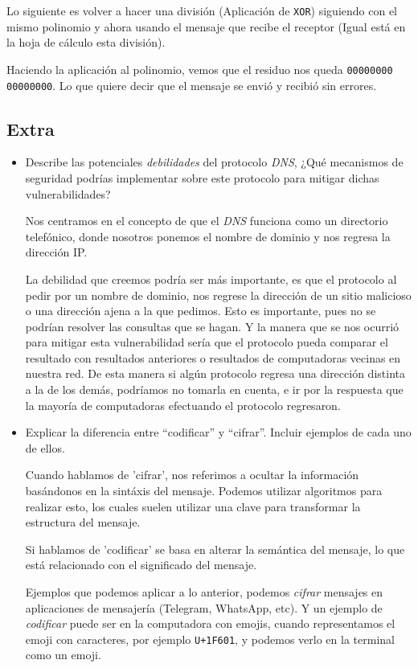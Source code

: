 \documentclass[spanish,12pt,letterpaper]{article}
\begin{document}
Lo siguiente es volver a hacer una división (Aplicación de \texttt{XOR})
siguiendo con el mismo polinomio y ahora usando el mensaje que recibe el
receptor (Igual está en la hoja de cálculo esta división).

Haciendo la aplicación al polinomio, vemos que el residuo nos queda
\texttt{00000000 00000000}. Lo que quiere decir que el mensaje se envió y recibió
sin errores.


\subsection{Extra}
\begin{itemize}
\item Describe las potenciales \textit{debilidades} del protocolo \textit{DNS},
  ¿Qué mecanismos de seguridad podrías implementar sobre este protocolo para
  mitigar dichas vulnerabilidades?

  Nos centramos en el concepto de que el \textit{DNS} funciona como un directorio
  telefónico, donde nosotros ponemos el nombre de dominio y nos regresa la
  dirección IP.

  La debilidad que creemos podría ser más importante, es que el protocolo al
  pedir por un nombre de dominio, nos regrese la dirección de un sitio malicioso
  o una dirección ajena a la que pedimos. Esto es importante, pues no se podrían
  resolver las consultas que se hagan. Y la manera que se nos ocurrió para
  mitigar esta vulnerabilidad sería que el protocolo pueda comparar el resultado
  con resultados anteriores o resultados de computadoras vecinas en nuestra red.
  De esta manera si algún protocolo regresa una dirección distinta a la de los
  demás, podríamos no tomarla en cuenta, e ir por la respuesta que la mayoría de
  computadoras efectuando el protocolo regresaron.

  
\item Explicar la diferencia entre ``codificar'' y ``cifrar''. Incluir ejemplos
  de cada uno de ellos.

  Cuando hablamos de 'cifrar', nos referimos a ocultar la información basándonos
  en la sintáxis del mensaje. Podemos utilizar algoritmos para realizar esto, los
  cuales suelen utilizar una clave para transformar la estructura del mensaje.

  Si hablamos de 'codificar' se basa en alterar la semántica del mensaje, lo que
  está relacionado con el significado del mensaje.

  Ejemplos que podemos aplicar a lo anterior, podemos \textit{cifrar} mensajes en
  aplicaciones de mensajería (Telegram, WhatsApp, etc). Y un ejemplo de \textit{
    codificar} puede ser en la computadora con emojis, cuando representamos el
  emoji con caracteres, por ejemplo \texttt{U+1F601}, y podemos verlo en la
  terminal como un emoji.
\end{itemize}
\end{document}
